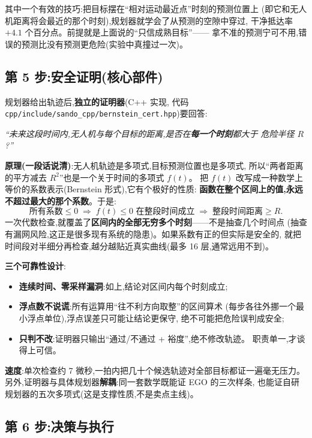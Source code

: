 \documentclass[11pt]{ctexart}
\newcommand{\code}[1]{\texttt{#1}}
\begin{document}
其中一个有效的技巧:把目标摆在``相对运动最近点''时刻的预测位置上
(即它和无人机距离将会最近的那个时刻),规划器就学会了从预测的空隙中穿过,
干净抵达率 $+4.1$ 个百分点。前提就是上面说的``只信成熟目标''——
拿不准的预测宁可不用,错误的预测比没有预测更危险(实验中真撞过一次)。

\subsection{第 5 步:安全证明(核心部件)}\label{sec:cert}

规划器给出轨迹后,\textbf{独立的证明器}(C++ 实现,
代码 \code{cpp/include/sando\_cpp/bernstein\_cert.hpp})要回答:

\begin{center}
\emph{``未来这段时间内,无人机与每个目标的距离,是否在\textbf{每一个时刻}都大于
危险半径 $R$?''}
\end{center}

\textbf{原理(一段话说清)}:无人机轨迹是多项式,目标预测位置也是多项式,
所以``两者距离的平方减去 $R^2$''也是一个关于时间的多项式 $f(t)$。
把 $f(t)$ 改写成一种数学上等价的系数表示(Bernstein 形式),它有个极好的性质:
\textbf{函数在整个区间上的值,永远不超过最大的那个系数}。于是:
\[
  \text{所有系数} \le 0 \;\Longrightarrow\; f(t)\le 0 \text{ 在整段时间成立}
  \;\Longrightarrow\; \text{整段时间距离} \ge R .
\]
一次代数检查,就覆盖了\textbf{区间内的全部无穷多个时刻}——不是抽查几个时间点
(抽查有漏网风险,这正是很多现有系统的隐患)。如果系数有正的但实际是安全的,
就把时间段对半细分再检查,越分越贴近真实曲线(最多 16 层,通常远用不到)。

\textbf{三个可靠性设计}:
\begin{itemize}
  \item \textbf{连续时间、零采样漏洞}:如上,结论对区间内每个时刻成立;
  \item \textbf{浮点数不说谎}:所有运算用``往不利方向取整''的区间算术
        (每步各往外挪一个最小浮点单位),浮点误差只可能让结论更保守,
        绝不可能把危险误判成安全;
  \item \textbf{只判不改}:证明器只输出``通过/不通过 + 裕度'',绝不修改轨迹。
        职责单一,才谈得上可信。
\end{itemize}

\textbf{速度}:单次检查约 7 微秒,一拍内把几十个候选轨迹对全部目标都证一遍毫无压力。
另外,证明器与具体规划器\textbf{解耦}:同一套数学既能证 EGO 的三次样条,
也能证自研规划器的五次多项式(这是支撑性质,不是卖点主线)。

\subsection{第 6 步:决策与执行}\label{sec:decide}
\end{document}
